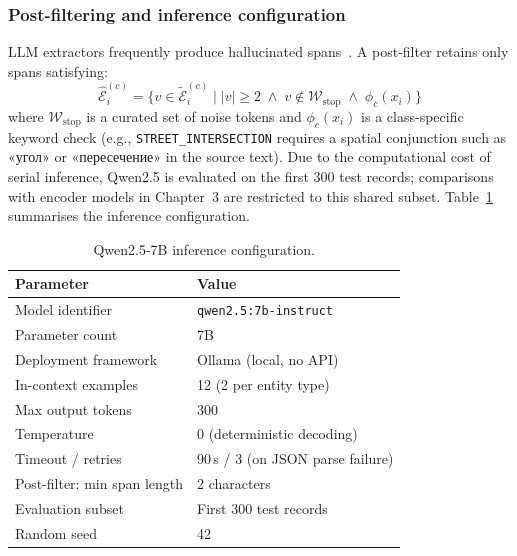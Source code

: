 \subsubsection{Post-filtering and inference configuration}

LLM extractors frequently produce hallucinated spans~\cite{keraghel2024survey}. A post-filter retains only spans satisfying:
\begin{equation}
  \hat{\mathcal{E}}_i^{(c)} = \bigl\{v \in \tilde{\mathcal{E}}_i^{(c)} \;\big|\; |v| \geq 2 \;\wedge\; v \notin \mathcal{W}_{\text{stop}} \;\wedge\; \phi_c(x_i)\bigr\}
  \label{eq:postfilter}
\end{equation}
where $\mathcal{W}_{\text{stop}}$ is a curated set of noise tokens and $\phi_c(x_i)$ is a class-specific keyword check (e.g., \texttt{STREET\_INTERSECTION} requires a spatial conjunction such as \foreignlanguage{russian}{«угол»} or \foreignlanguage{russian}{«пересечение»} in the source text). Due to the computational cost of serial inference, Qwen2.5 is evaluated on the first 300 test records; comparisons with encoder models in Chapter~3 are restricted to this shared subset. Table~\ref{tab:llm_config} summarises the inference configuration.

\begin{table}[H]
\centering
\caption{Qwen2.5-7B inference configuration.}
\label{tab:llm_config}
\renewcommand{\arraystretch}{1.3}
\begin{tabular}{ll}
\toprule
\textbf{Parameter}            & \textbf{Value} \\
\midrule
Model identifier              & \texttt{qwen2.5:7b-instruct}~\cite{yang2024qwen} \\
Parameter count               & 7B \\
Deployment framework          & Ollama (local, no API) \\
In-context examples           & 12 (2 per entity type) \\
Max output tokens             & 300 \\
Temperature                   & 0 (deterministic decoding) \\
Timeout / retries             & 90\,s / 3 (on JSON parse failure) \\
Post-filter: min span length  & 2 characters \\
Evaluation subset             & First 300 test records \\
Random seed                   & 42 \\
\bottomrule
\end{tabular}
\end{table}

